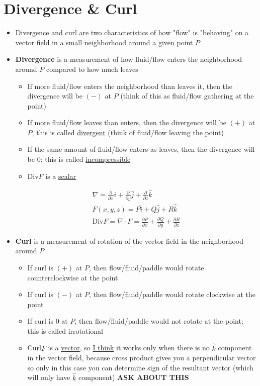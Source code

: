 \documentclass{article}
\begin{document}
\section{Divergence \& Curl}
\begin{itemize}
  \item Divergence and curl are two characteristics of how "flow" is "behaving" on a vector field in a small neighborhood around a given point $P$
  \item \textbf{Divergence} is a measurement of how fluid/flow enters the neighborhood around $P$ compared to how much leaves
  \begin{itemize}
    \item If more fluid/flow enters the neighborhood than leaves it, then the divergence will be $(-)$ at $P$ (think of this as fluid/flow gathering at the point)
    \item If more fluid/flow leaves than enters, then the divergence will be $(+)$ at $P$; this is called \underline{divergent} (think of fluid/flow leaving the point)
    \item If the same amount of fluid/flow enters as leaves, then the divergence will be 0; this is called \underline{incompressible}
    \item Div$F$ is a \underline{scalar}
  \end{itemize}
  \begin{align}
    \nabla = \frac{\partial}{\partial x}\hat{i} + \frac{\partial}{\partial y}\hat{j} + \frac{\partial}{\partial z}\hat{k} \\
    F(x,y,z) = P\hat{i} + Q\hat{j} + R\hat{k} \\
    \textrm{Div}F = \nabla\cdot F = \frac{\partial P}{\partial x} + \frac{\partial Q}{\partial y} + \frac{\partial R}{\partial z}
  \end{align}
  \item \textbf{Curl} is a measurement of rotation of the vector field in the neighborhood around $P$
  \begin{itemize}
    \item If curl is $(+)$ at $P$, then flow/fluid/paddle would rotate counterclockwise at the point
    \item If curl is $(-)$ at $P$, then flow/fluid/paddle would rotate clockwise at the point
    \item If curl is 0 at $P$, then flow/fluid/paddle would not rotate at the point; this is called irrotational
    \item Curl$F$ is a \underline{vector}, so \underline{I think} it works only when there is no $\hat{k}$ component in the vector field, because cross product gives you a perpendicular vector so only in this case you can determine sign of the resultant vector (which will only have $\hat{k}$ component) \textbf{ASK ABOUT THIS}

\end{itemize}
\end{itemize}
\end{document}
